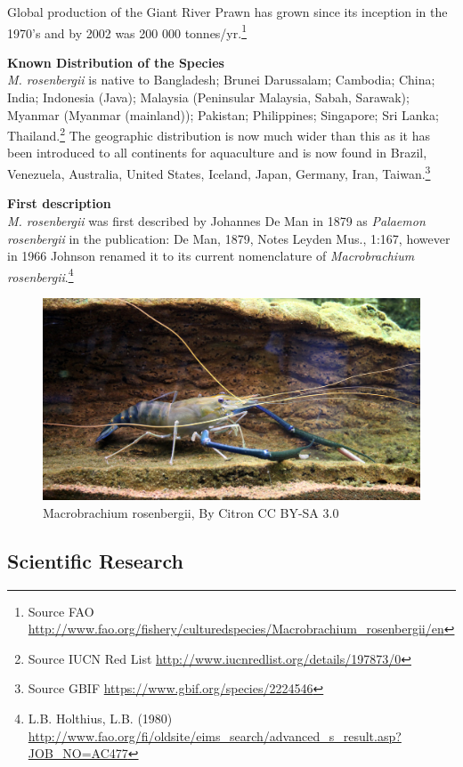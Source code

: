 \documentclass[openany]{book}
\let\rmarkdownfootnote\footnote%
\def\footnote{\protect\rmarkdownfootnote}
\theoremstyle{definition}
\theoremstyle{definition}
\theoremstyle{definition}
\theoremstyle{remark}
\begin{document}
Global production of the Giant River Prawn has grown since its inception
in the 1970's and by 2002 was 200 000 tonnes/yr.\footnote{Source FAO
  \url{http://www.fao.org/fishery/culturedspecies/Macrobrachium_rosenbergii/en}}

\textbf{Known Distribution of the Species}\\
\emph{M. rosenbergii} is native to Bangladesh; Brunei Darussalam;
Cambodia; China; India; Indonesia (Java); Malaysia (Peninsular Malaysia,
Sabah, Sarawak); Myanmar (Myanmar (mainland)); Pakistan; Philippines;
Singapore; Sri Lanka; Thailand.\footnote{Source IUCN Red List
  \url{http://www.iucnredlist.org/details/197873/0}} The geographic
distribution is now much wider than this as it has been introduced to
all continents for aquaculture and is now found in Brazil, Venezuela,
Australia, United States, Iceland, Japan, Germany, Iran,
Taiwan.\footnote{Source GBIF \url{https://www.gbif.org/species/2224546}}

\textbf{First description}\\
\emph{M. rosenbergii} was first described by Johannes De Man in 1879 as
\emph{Palaemon rosenbergii} in the publication: De Man, 1879, Notes
Leyden Mus., 1:167, however in 1966 Johnson renamed it to its current
nomenclature of \emph{Macrobrachium rosenbergii}.\footnote{L.B.
  Holthius, L.B. (1980)
  \url{http://www.fao.org/fi/oldsite/eims_search/advanced_s_result.asp?JOB_NO=AC477}}

\begin{figure}

{\centering \includegraphics[width=0.7\linewidth]{images_species/Macrobrachium_rosenbergii} 

}

\caption{Macrobrachium rosenbergii, By Citron CC BY-SA 3.0}\label{fig:unnamed-chunk-5}
\end{figure}

\hypertarget{scientific-research-3}{%
\subsection{Scientific Research}\label{scientific-research-3}}
\end{document}
